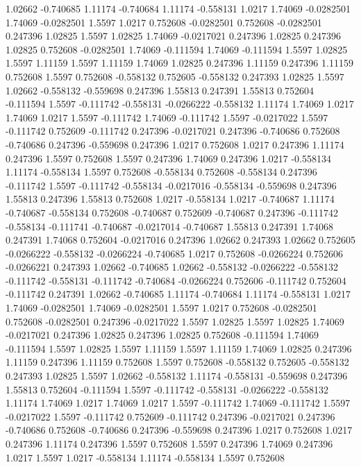 1.02662 -0.740685
1.11174 -0.740684
1.11174 -0.558131
1.0217 1.74069
-0.0282501 1.74069
-0.0282501 1.5597
1.0217 0.752608
-0.0282501 0.752608
-0.0282501 0.247396
1.02825 1.5597
1.02825 1.74069
-0.0217021 0.247396
1.02825 0.247396
1.02825 0.752608
-0.0282501 1.74069
-0.111594 1.74069
-0.111594 1.5597
1.02825 1.5597
1.11159 1.5597
1.11159 1.74069
1.02825 0.247396
1.11159 0.247396
1.11159 0.752608
1.5597 0.752608
-0.558132 0.752605
-0.558132 0.247393
1.02825 1.5597
1.02662 -0.558132
-0.559698 0.247396
1.55813 0.247391
1.55813 0.752604
-0.111594 1.5597
-0.111742 -0.558131
-0.0266222 -0.558132
1.11174 1.74069
1.0217 1.74069
1.0217 1.5597
-0.111742 1.74069
-0.111742 1.5597
-0.0217022 1.5597
-0.111742 0.752609
-0.111742 0.247396
-0.0217021 0.247396
-0.740686 0.752608
-0.740686 0.247396
-0.559698 0.247396
1.0217 0.752608
1.0217 0.247396
1.11174 0.247396
1.5597 0.752608
1.5597 0.247396
1.74069 0.247396
1.0217 -0.558134
1.11174 -0.558134
1.5597 0.752608
-0.558134 0.752608
-0.558134 0.247396
-0.111742 1.5597
-0.111742 -0.558134
-0.0217016 -0.558134
-0.559698 0.247396
1.55813 0.247396
1.55813 0.752608
1.0217 -0.558134
1.0217 -0.740687
1.11174 -0.740687
-0.558134 0.752608
-0.740687 0.752609
-0.740687 0.247396
-0.111742 -0.558134
-0.111741 -0.740687
-0.0217014 -0.740687
1.55813 0.247391
1.74068 0.247391
1.74068 0.752604
-0.0217016 0.247396
1.02662 0.247393
1.02662 0.752605
-0.0266222 -0.558132
-0.0266224 -0.740685
1.0217 0.752608
-0.0266224 0.752606
-0.0266221 0.247393
1.02662 -0.740685
1.02662 -0.558132
-0.0266222 -0.558132
-0.111742 -0.558131
-0.111742 -0.740684
-0.0266224 0.752606
-0.111742 0.752604
-0.111742 0.247391
1.02662 -0.740685
1.11174 -0.740684
1.11174 -0.558131
1.0217 1.74069
-0.0282501 1.74069
-0.0282501 1.5597
1.0217 0.752608
-0.0282501 0.752608
-0.0282501 0.247396
-0.0217022 1.5597
1.02825 1.5597
1.02825 1.74069
-0.0217021 0.247396
1.02825 0.247396
1.02825 0.752608
-0.111594 1.74069
-0.111594 1.5597
1.02825 1.5597
1.11159 1.5597
1.11159 1.74069
1.02825 0.247396
1.11159 0.247396
1.11159 0.752608
1.5597 0.752608
-0.558132 0.752605
-0.558132 0.247393
1.02825 1.5597
1.02662 -0.558132
1.11174 -0.558131
-0.559698 0.247396
1.55813 0.752604
-0.111594 1.5597
-0.111742 -0.558131
-0.0266222 -0.558132
1.11174 1.74069
1.0217 1.74069
1.0217 1.5597
-0.111742 1.74069
-0.111742 1.5597
-0.0217022 1.5597
-0.111742 0.752609
-0.111742 0.247396
-0.0217021 0.247396
-0.740686 0.752608
-0.740686 0.247396
-0.559698 0.247396
1.0217 0.752608
1.0217 0.247396
1.11174 0.247396
1.5597 0.752608
1.5597 0.247396
1.74069 0.247396
1.0217 1.5597
1.0217 -0.558134
1.11174 -0.558134
1.5597 0.752608
